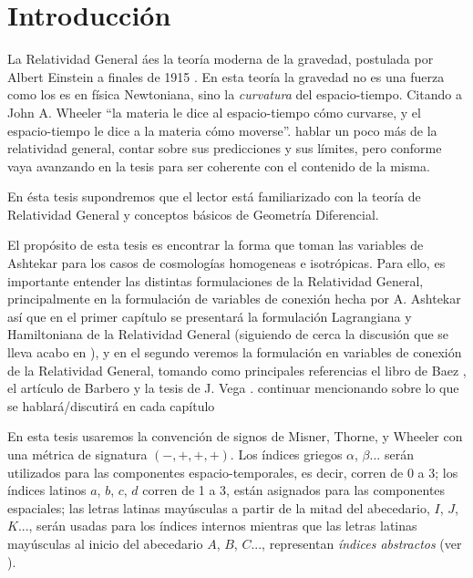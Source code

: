 \documentclass[10pt, letterpaper, spanish]{book}
\theoremstyle{definition}
\theoremstyle{plain}
\theoremstyle{remark}
\theoremstyle{break}
\begin{document}
\printnomenclature
\tableofcontents{}




\chapter*{Introducción}

La Relatividad General áes la teoría moderna de la gravedad, postulada por Albert Einstein a finales de 1915 \cite{Einstein}. En esta teoría la gravedad no es una fuerza como los es en física Newtoniana, sino la \emph{curvatura} del espacio-tiempo. Citando a John A. Wheeler ``la materia le dice al espacio-tiempo cómo curvarse, y el espacio-tiempo le dice a la materia cómo moverse''. {\color{OliveGreen} hablar un poco más de la relatividad general, contar sobre sus predicciones y sus límites, pero conforme vaya avanzando en la tesis para ser coherente con el contenido de la misma.}

En ésta tesis supondremos que el lector está familiarizado con la teoría de Relatividad General y conceptos básicos de Geometría Diferencial.

El propósito de esta tesis es encontrar la forma que toman las variables de Ashtekar para los casos de cosmologías homogeneas e isotrópicas. Para ello, es importante entender las distintas formulaciones de la Relatividad General, principalmente en la formulación de variables de conexión hecha por A. Ashtekar \cite{Ashtekar86, Ashtekar87} así que en el primer capítulo se presentará la formulación Lagrangiana y Hamiltoniana de la Relatividad General (siguiendo de cerca la discusión que se lleva acabo en \cite{Poisson}), y en el segundo veremos la formulación en variables de conexión de la Relatividad General, tomando como principales referencias el libro de Baez \cite{Baez}, el artículo de Barbero \cite{Barbero} y la tesis de J. Vega \cite{Vega}. {\color{OliveGreen}continuar mencionando sobre lo que se hablará/discutirá en cada capítulo}

En esta tesis usaremos la convención de signos de Misner, Thorne, y Wheeler con una métrica de signatura $(-,+,+,+)$. Los índices griegos $\alpha$, $\beta...$ serán utilizados para las componentes espacio-temporales, es decir, corren de 0 a 3; los índices latinos $a$, $b$, $c$, $d$ corren de 1 a 3, están asignados para las componentes espaciales; las letras latinas mayúsculas a partir de la mitad del abecedario, $I$, $J$, $K$..., serán usadas para los índices internos mientras que las letras latinas mayúsculas al inicio del abecedario $A$, $B$, $C$..., representan \emph{índices abstractos} (ver \cite{Wald}).
\end{document}
